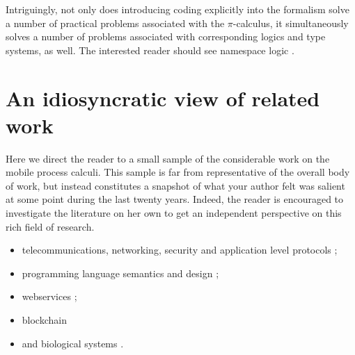 Intriguingly, not only does introducing coding explicitly into the
formalism solve a number of practical problems associated with the
$\pi$-calculus, it simultaneously solves a number of problems
associated with corresponding logics and type systems, as well. The
interested reader should see namespace logic
\cite{DBLP:conf/tgc/MeredithR05}.

\section{An idiosyncratic view of related work}

Here we direct the reader to a small sample of the considerable work
on the mobile process calculi. This sample is far from representative
of the overall body of work, but instead constitutes a snapshot of
what your author felt was salient at some point during the last twenty
years. Indeed, the reader is encouraged to investigate the literature
on her own to get an independent perspective on this rich field of
research.

\begin{itemize}
\item telecommunications, networking, security and application level protocols
\cite{DBLP:conf/popl/AbadiB02} 
\cite{DBLP:journals/tcs/AbadiB03} 
\cite{DBLP:conf/epew/BrownLM05} 
\cite{DBLP:conf/fossacs/LaneveZ05}; 
\item programming language semantics and design
\cite{DBLP:conf/epew/BrownLM05}
\cite{djoin}
\cite{DBLP:conf/afp/FournetFMS02}
\cite{DBLP:journals/toplas/SewellWU10};
\item webservices
\cite{DBLP:conf/epew/BrownLM05}
\cite{DBLP:conf/fossacs/LaneveZ05}
\cite{DBLP:conf/wise/Meredith03};
\item{blockchain}
  \cite{meredith_2017}
\item and biological systems
\cite{DBLP:conf/cmsb/Cardelli04}
\cite{DBLP:conf/esop/DanosL03}
\cite{DBLP:conf/psb/RegevSS01}
\cite{DBLP:journals/ipl/PriamiRSS01}.
\end{itemize}


